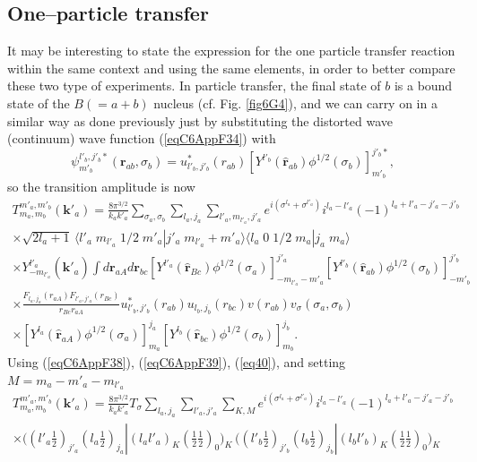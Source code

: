 \begin{subappendices}
\subsection{One--particle transfer}
It may be interesting to state the expression for the one particle transfer reaction within the same context and using the same elements, in order to better compare these two type of experiments. In particle transfer, the final state of $b$ is a bound state of the $B(=a+b)$ nucleus (cf. Fig. \ref{fig6G4}), and we can carry on in a similar way as done previously just by substituting the distorted wave (continuum) wave function (\ref{eqC6AppF34}) with
 \begin{equation}\label{eqC6AppG57}
\psi_{m'_b}^{l'_b,j'_b*}(\mathbf{r}_{ab},\sigma_b)=u^*_{l'_b,j'_b}(r_{ab})\left[ Y^{l'_b} (\hat {\mathbf{r}}_{ab})\phi^{1/2}(\sigma_b)\right]^{j'_b*}_{m'_b},
\end{equation}
so the transition amplitude is now
\begin{multline}\label{eqC6AppG58}
T_{m_a,m_b}^{m'_a,m'_b}(\mathbf{k}'_a)=\frac{8\pi^{3/2}}{k_ak'_a}\sum_{\sigma_a,\sigma_b}\sum_{l_a,j_a}\sum_{l'_a,m_{l'_a},j'_a}
 e^{i(\sigma^{l_a}+\sigma^{l'_a})}i^{l_a-l'_a}(-1)^{l_a+l'_a-j'_a-j'_b}\\
\times \sqrt{2l_a+1}\,\langle l'_a\;m_{l'_a}\;1/2\;m'_a|j'_a\;m_{l'_a}+m'_a\rangle \langle l_a\;0\;1/2\;m_a|j_a\;m_a\rangle\\
\times Y^{l'_a}_{-m_{l'_a}} (\hat {\mathbf{k}}'_a)
\int d\mathbf{r}_{aA}d \mathbf{r}_{bc}\left[ Y^{l'_a} (\hat {\mathbf{r}}_{Bc})\phi^{1/2}(\sigma_a)\right]^{j'_a}_{-m_{l'_a}-m'_a}\left[ Y^{l'_b} (\hat {\mathbf{r}}_{ab})\phi^{1/2}(\sigma_b)\right]^{j'_b}_{-m'_b}\\
\times \frac{F_{l_a,j_a}(r_{aA})  F_{l'_a,j'_a}(r_{Bc})}{r_{Bc}r_{aA}}u^*_{l'_b,j'_b}(r_{ab})u_{l_b,j_b}(r_{bc})v(r_{ab})v_\sigma(\sigma_a,\sigma_b)\\
\times\left[ Y^{l_a} (\hat {\mathbf{r}}_{aA})\phi^{1/2}(\sigma_a)\right]^{j_a}_{m_a}\left[ Y^{l_b} (\hat {\mathbf{r}}_{bc})\phi^{1/2}(\sigma_b)\right]^{j_b}_{m_b}.
\end{multline}
Using (\ref{eqC6AppF38}), (\ref{eqC6AppF39}), (\ref{eq40}), and setting $M=m_a-m'_a-m_{l'_a}$
\begin{multline}\label{eqC6AppG59}
T_{m_a,m_b}^{m'_a,m'_b}(\mathbf{k}'_a)=\frac{8\pi^{3/2}}{k_ak'_a}T_{\sigma}\sum_{l_a,j_a}\sum_{l'_a,j'_a}\sum_{K,M}
 e^{i(\sigma^{l_a}+\sigma^{l'_a})}i^{l_a-l'_a}(-1)^{l_a+l'_a-j'_a-j'_b}\\
 \times\bigl((l'_a \tfrac{1}{2})_{j'_a}(l_a \tfrac{1}{2})_{j_a}|(l_a l'_a)_K(\tfrac{1}{2} \tfrac{1}{2})_0\bigr)_K\,\bigl((l'_b \tfrac{1}{2})_{j'_b}(l_b \tfrac{1}{2})_{j_b}|(l_b l'_b)_{K}(\tfrac{1}{2} \tfrac{1}{2})_0\bigr)_{K}\\

\end{multline}
\end{subappendices}
